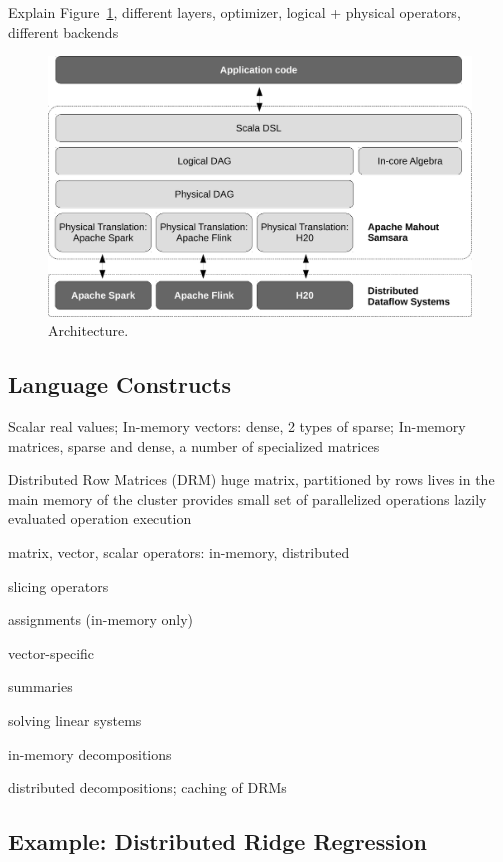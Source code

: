 \documentclass{article}
\begin{document}
Explain Figure~\ref{fig:architecture}, different layers, optimizer, logical + physical operators, different backends

\begin{figure}
  \centering
  \includegraphics[scale=.5]{figures/architecture-crop}
  \caption{Architecture.}
  \label{fig:architecture}
\end{figure}

\subsection{Language Constructs}

Scalar real values; In-memory vectors: dense, 2 types of sparse; In-memory matrices, sparse and dense, a number of specialized matrices

Distributed Row Matrices (DRM)
huge matrix, partitioned by rows
lives in the main memory of the cluster
provides small set of parallelized 
       operations
lazily evaluated operation execution

matrix, vector, scalar operators: 
in-memory, distributed


slicing operators



assignments (in-memory only)


vector-specific

summaries

solving linear systems

in-memory decompositions



distributed decompositions; caching of DRMs

\subsection{Example: Distributed Ridge Regression}
\end{document}
